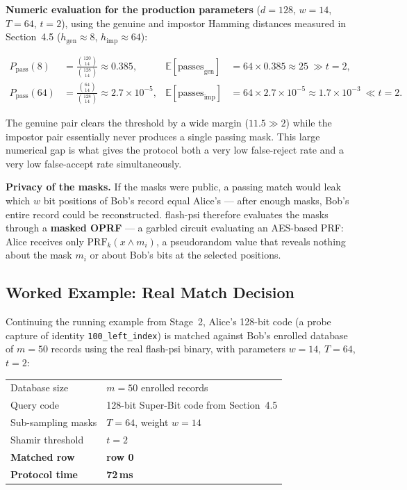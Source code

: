 \documentclass[11pt]{article}
\begin{document}
\textbf{Numeric evaluation for the production parameters} ($d=128$, $w=14$, $T=64$,
$t=2$), using the genuine and impostor Hamming distances measured in Section~4.5
($h_{\text{gen}}\approx 8$, $h_{\text{imp}}\approx 64$):

\begin{align}
P_{\text{pass}}(8)  &= \frac{\binom{120}{14}}{\binom{128}{14}} \approx 0.385,
&\mathbb{E}[\text{passes}_{\text{gen}}] &= 64 \times 0.385 \approx 25 \ \gg t=2, \\[4pt]
P_{\text{pass}}(64) &= \frac{\binom{64}{14}}{\binom{128}{14}} \approx 2.7\times10^{-5},
&\mathbb{E}[\text{passes}_{\text{imp}}] &= 64 \times 2.7\times10^{-5} \approx 1.7\times10^{-3} \ \ll t=2.
\end{align}

The genuine pair clears the threshold by a wide margin ($11.5 \gg 2$) while the impostor
pair essentially never produces a single passing mask. This large numerical gap is what
gives the protocol both a very low false-reject rate and a very low false-accept rate
simultaneously.

\textbf{Privacy of the masks.} If the masks were public, a passing match would leak which
$w$ bit positions of Bob's record equal Alice's --- after enough masks, Bob's entire record
could be reconstructed. flash-psi therefore evaluates the masks through a \textbf{masked
OPRF} --- a garbled circuit evaluating an AES-based PRF: Alice receives only $\mathrm{PRF}_k(x \wedge
m_i)$, a pseudorandom value that reveals nothing about the mask $m_i$ or about Bob's bits at
the selected positions.

\subsection{Worked Example: Real Match Decision}

Continuing the running example from Stage~2, Alice's 128-bit code (a probe capture of
identity \texttt{100\_left\_index}) is matched against Bob's enrolled database of $m=50$
records using the real flash-psi binary, with parameters $w=14$, $T=64$, $t=2$:

\begin{center}
\begin{tabular}{ll}
\toprule
Database size & $m = 50$ enrolled records \\
Query code & 128-bit Super-Bit code from Section~4.5 \\
Sub-sampling masks & $T = 64$, weight $w = 14$ \\
Shamir threshold & $t = 2$ \\
\textbf{Matched row} & \textbf{row 0} \\
\textbf{Protocol time} & \textbf{72\,ms} \\
\bottomrule
\end{tabular}
\end{center}
\end{document}
